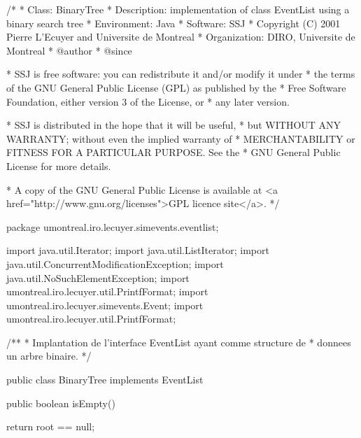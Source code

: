 \begin{code}
\begin{hide}
/*
 * Class:        BinaryTree
 * Description:  implementation of class EventList using a binary search tree
 * Environment:  Java
 * Software:     SSJ 
 * Copyright (C) 2001  Pierre L'Ecuyer and Universite de Montreal
 * Organization: DIRO, Universite de Montreal
 * @author       
 * @since

 * SSJ is free software: you can redistribute it and/or modify it under
 * the terms of the GNU General Public License (GPL) as published by the
 * Free Software Foundation, either version 3 of the License, or
 * any later version.

 * SSJ is distributed in the hope that it will be useful,
 * but WITHOUT ANY WARRANTY; without even the implied warranty of
 * MERCHANTABILITY or FITNESS FOR A PARTICULAR PURPOSE.  See the
 * GNU General Public License for more details.

 * A copy of the GNU General Public License is available at
   <a href="http://www.gnu.org/licenses">GPL licence site</a>.
 */
\end{hide}
package umontreal.iro.lecuyer.simevents.eventlist;\begin{hide}

import java.util.Iterator;
import java.util.ListIterator;
import java.util.ConcurrentModificationException;
import java.util.NoSuchElementException;
import umontreal.iro.lecuyer.util.PrintfFormat;
import umontreal.iro.lecuyer.simevents.Event;
import umontreal.iro.lecuyer.util.PrintfFormat;

/**
 *  Implantation de l'interface EventList ayant comme structure de
 *  donnees un arbre binaire.
 */
\end{hide}

public class BinaryTree implements EventList\begin{hide} {
   // racine de l'arbre
   private Entry root = null;

   // liste d'objets qui peuvent etre reutilises
   private Entry freeEntries = null;

   // compteur de modifications sur l'iterateur.
   private int modCount = 0;\end{hide}
\end{code}\begin{hide}\begin{code}

   public boolean isEmpty()\begin{hide} {
      return root == null;
   }\end{hide}


\end{code}
\end{hide}
